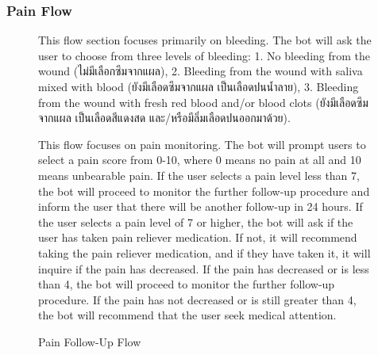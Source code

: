 \documentclass[12pt,oneside,openright,a4paper]{cpe-english-project}
\begin{document}
        \subsubsection{Pain Flow}
          \begin{figure}[!h]
            \centering
            \caption{Pain Follow-Up Flow}\label{fig:FollowUpFlow3}
            \begin{flushleft}
              \qquad This flow section focuses primarily on bleeding. The bot will ask the user to choose from three levels of bleeding: 1. No bleeding from the wound \textthai{(ไม่มีเลือกซึมจากแผล)}, 2. Bleeding from the wound with saliva mixed with blood \textthai{(ยังมีเลือดซึมจากแผล เป็นเลือดปนน้ำลาย)}, 3. Bleeding from the wound with fresh red blood and/or blood clots \textthai{(ยังมีเลือดซึมจากแผล เป็นเลือดสีแดงสด และ/หรือมีลิ่มเลือดปนออกมาด้วย)}.\par
              \qquad This flow focuses on pain monitoring. The bot will prompt users to select a pain score from 0-10, where 0 means no pain at all and 10 means unbearable pain. If the user selects a pain level less than 7, the bot will proceed to monitor the  further follow-up procedure and inform the user that there will be another follow-up in 24 hours. If the user selects a pain level of 7 or higher, the bot will ask if the user has taken pain reliever medication. If not, it will recommend taking the pain reliever medication, and if they have taken it, it will inquire if the pain has decreased. If the pain has decreased or is less than 4, the bot will proceed to monitor the further follow-up procedure. If the pain has not decreased or is still greater than 4, the bot will recommend that the user seek medical attention.\par
            \end{flushleft}        
          \end{figure}
\end{document}
